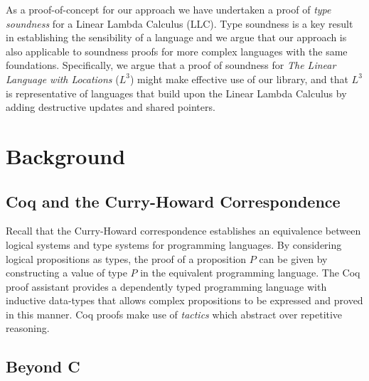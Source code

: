 \documentclass[]{unswthesis}
\let\i\textit
\begin{document}
As a proof-of-concept for our approach we have undertaken a proof of \i{type soundness} for a Linear Lambda Calculus (LLC). Type soundness is a key result in establishing the sensibility of a language and we argue that our approach is also applicable to soundness proofs for more complex languages with the same foundations. Specifically, we argue that a proof of soundness for \i{The Linear Language with Locations} ($L^3$) might make effective use of our library, and that $L^3$ is representative of languages that build upon the Linear Lambda Calculus by adding destructive updates and shared pointers.

\chapter{Background}
\label{ch:background}

\section{Coq and the Curry-Howard Correspondence}
\label{sec:curry_howard}

Recall that the Curry-Howard correspondence establishes an equivalence between logical systems and type systems for programming languages. By considering logical propositions as types, the proof of a proposition $P$ can be given by constructing a value of type $P$ in the equivalent programming language. The Coq proof assistant provides a dependently typed programming language with inductive data-types that allows complex propositions to be expressed and proved in this manner. Coq proofs make use of \i{tactics} which abstract over repetitive reasoning.

\section{Beyond C}
\end{document}
